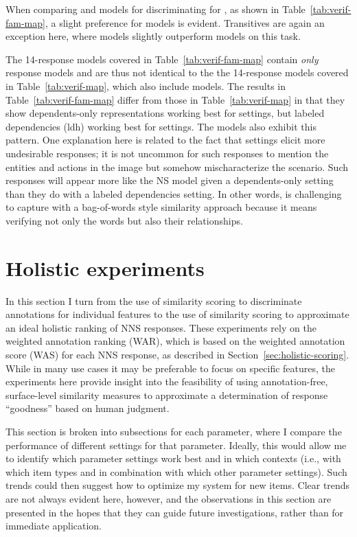 When comparing  and  models for discriminating for , as shown in Table~\ref{tab:verif-fam-map}, a slight preference for  models is evident. Transitives are again an exception here, where  models slightly outperform  models on this task.

The  14-response models covered in Table~\ref{tab:verif-fam-map} contain \textit{only}  response models and are thus not identical to the the  14-response models covered in Table~\ref{tab:verif-map}, which also include  models. The  results in Table~\ref{tab:verif-fam-map} differ from those in Table~\ref{tab:verif-map} in that they show dependents-only representations working best for   settings, but  labeled dependencies (ldh) working best for  settings. The  models also exhibit this pattern. One explanation here is related to the fact that   settings elicit more undesirable responses; it is not uncommon for such responses to mention the entities and actions in the image but somehow mischaracterize the scenario. Such responses will appear more like the NS model given a dependents-only setting than they do with a labeled dependencies setting. In other words,  is challenging to capture with a bag-of-words style similarity approach because it means verifying not only the words but also their relationships.


\section{Holistic experiments}
\label{sec:exp-holistic}
In this section I turn from the use of similarity scoring to discriminate annotations for individual features to the use of similarity scoring to approximate an ideal holistic ranking of NNS responses. These experiments rely on the weighted annotation ranking (WAR), which is based on the weighted annotation score (WAS) for each NNS response, as described in Section~\ref{sec:holistic-scoring}. While in many use cases it may be preferable to focus on specific features, the experiments here provide insight into the feasibility of using annotation-free, surface-level similarity measures to approximate a determination of response ``goodness'' based on human judgment.

This section is broken into subsections for each parameter, where I compare the performance of different settings for that parameter. Ideally, this would allow me to identify which parameter settings work best and in which contexts (i.e., with which item types and in combination with which other parameter settings). Such trends could then suggest how to optimize my system for new items. Clear trends are not always evident here, however, and the observations in this section are presented in the hopes that they can guide future investigations, rather than for immediate application.


